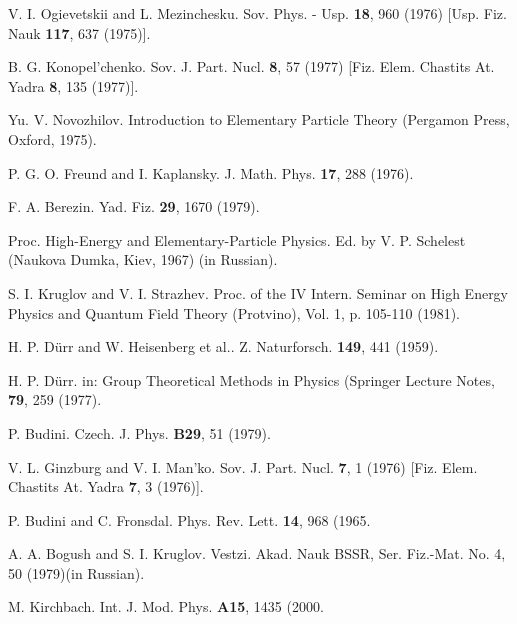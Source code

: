 \documentclass[a4paper,12pt]{article}
\begin{document}
\begin{thebibliography}{99}
\bibitem{}  V. I. Ogievetskii and L. Mezinchesku. Sov. Phys. - Usp.
\textbf{18}, 960 (1976) [Usp. Fiz. Nauk \textbf{117}, 637 (1975)].

\bibitem{}  B. G. Konopel'chenko. Sov. J. Part. Nucl. \textbf{8}, 57 (1977)
[Fiz. Elem. Chastits At. Yadra \textbf{8}, 135 (1977)].

\bibitem{}  Yu. V. Novozhilov. Introduction to Elementary Particle
Theory (Pergamon Press, Oxford, 1975).

\bibitem{}  P. G. O. Freund and I. Kaplansky. J. Math. Phys. \textbf{
17}, 288 (1976).

\bibitem{}  F. A. Berezin. Yad. Fiz. \textbf{29}, 1670 (1979).

\bibitem{}  Proc. High-Energy and Elementary-Particle Physics. Ed. by
V. P. Schelest (Naukova Dumka, Kiev, 1967) (in Russian).

\bibitem{}  S. I. Kruglov and V. I. Strazhev. Proc. of the IV Intern.
Seminar on High Energy Physics and Quantum Field Theory
(Protvino), Vol. 1, p. 105-110 (1981).

\bibitem{}  H. P. D\"urr and W. Heisenberg et al.. Z. Naturforsch.
\textbf{149}, 441 (1959).

\bibitem{}  H. P. D\"urr. in: Group Theoretical Methods in Physics
(Springer Lecture Notes, \textbf{79}, 259 (1977).

\bibitem{}  P. Budini. Czech. J. Phys. \textbf{B29}, 51 (1979).

\bibitem{}  V. L. Ginzburg and V. I. Man'ko. Sov. J. Part. Nucl.
\textbf{7}, 1 (1976) [Fiz. Elem. Chastits At. Yadra \textbf{7}, 3
(1976)].

\bibitem{}  P. Budini and C. Fronsdal. Phys. Rev. Lett. \textbf{14},
968 (1965.

\bibitem{}  A. A. Bogush and S. I. Kruglov. Vestzi. Akad. Nauk BSSR,
Ser. Fiz.-Mat. No. 4, 50 (1979)(in Russian).

\bibitem{}  M. Kirchbach. Int. J. Mod. Phys. \textbf{A15}, 1435 (2000.
\end{thebibliography}
\end{document}
